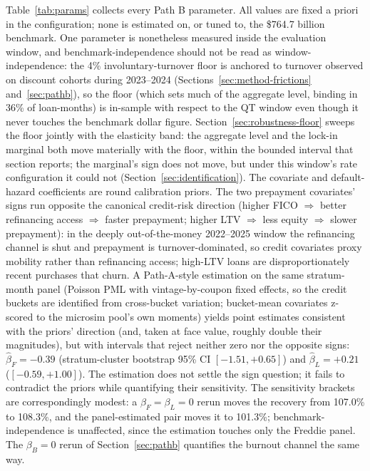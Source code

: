 \documentclass[12pt]{article}
\begin{document}
Table~\ref{tab:params} collects every Path B parameter. All values are fixed a priori in the configuration; none is estimated on, or tuned to, the \$764.7 billion benchmark. One parameter is nonetheless measured inside the evaluation window, and benchmark-independence should not be read as window-independence: the 4\% involuntary-turnover floor is anchored to turnover observed on discount cohorts during 2023--2024 (Sections~\ref{sec:method-frictions} and~\ref{sec:pathb}), so the floor (which sets much of the aggregate level, binding in 36\% of loan-months) is in-sample with respect to the QT window even though it never touches the benchmark dollar figure. Section~\ref{sec:robustness-floor} sweeps the floor jointly with the elasticity band: the aggregate level and the lock-in marginal both move materially with the floor, within the bounded interval that section reports; the marginal's sign does not move, but under this window's rate configuration it could not (Section~\ref{sec:identification}). The covariate and default-hazard coefficients are round calibration priors. The two prepayment covariates' signs run opposite the canonical credit-risk direction (higher FICO $\Rightarrow$ better refinancing access $\Rightarrow$ faster prepayment; higher LTV $\Rightarrow$ less equity $\Rightarrow$ slower prepayment): in the deeply out-of-the-money 2022--2025 window the refinancing channel is shut and prepayment is turnover-dominated, so credit covariates proxy mobility rather than refinancing access; high-LTV loans are disproportionately recent purchases that churn. A Path-A-style estimation on the same stratum-month panel (Poisson PML with vintage-by-coupon fixed effects, so the credit buckets are identified from cross-bucket variation; bucket-mean covariates z-scored to the microsim pool's own moments) yields point estimates consistent with the priors' direction (and, taken at face value, roughly double their magnitudes), but with intervals that reject neither zero nor the opposite signs: $\hat{\beta}_F = -0.39$ (stratum-cluster bootstrap 95\% CI $[-1.51, +0.65]$) and $\hat{\beta}_L = +0.21$ ($[-0.59, +1.00]$). The estimation does not settle the sign question; it fails to contradict the priors while quantifying their sensitivity. The sensitivity brackets are correspondingly modest: a $\beta_F = \beta_L = 0$ rerun moves the recovery from 107.0\% to 108.3\%, and the panel-estimated pair moves it to 101.3\%; benchmark-independence is unaffected, since the estimation touches only the Freddie panel. The $\beta_B = 0$ rerun of Section~\ref{sec:pathb} quantifies the burnout channel the same way.
\end{document}
